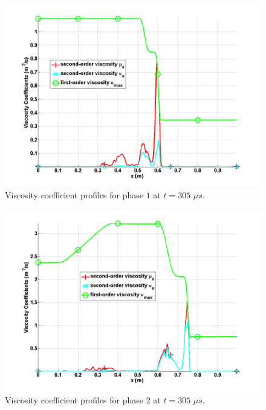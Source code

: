\begin{figure}[H]
\centering
\includegraphics[width=\textwidth]{figures/two_phases_liquid_viscosity_kappa_mu.png}
\caption{Viscosity coefficient profiles for phase $1$ at $t=305$ $\mu s$.}
\label{fig:two-indep-fluids-visc-2-7-eqn-sect4}
\end{figure}
%
\begin{figure}[H]
\centering
\includegraphics[width=\textwidth]{figures/two_phases_vapor_viscosity_kappa_mu.png}
\caption{Viscosity coefficient profiles for phase $2$ at $t=305$ $\mu s$.}
\label{fig:two-indep-fluids-visc-1-7-eqn-sect4}
\end{figure}
%
